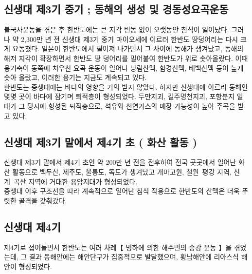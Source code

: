 \documentclass[12pt,a4paper]{book}
\begin{document}
		\subsection{신생대 제3기 중기 ; 동해의 생성 및  경동성요곡운동 }

				불국사운동을 겪은 후 한반도에는 큰 지각 변동 없이 오랫동안 침식이 일어났다. 
				그러나 약 2,300만 년 전 신생대 제3기 중기 마이오세에 이르러 
				한반도 땅덩어리는 다시 크게 요동쳤다. 
				일본이 한반도에서 떨어져 나가면서 그 사이에 동해가 생겨났고, 
				동해의 해저 지각이 확장하면서 한반도 땅 덩어리를 밀어붙여 한반도가 위로 솟아올랐다. 
				이때 융기축이 동쪽에 치우친 요곡 운동이 일어나 낭림산맥, 함경산맥, 태백산맥 등이 
				높게 솟아 올랐고, 이러한 융기는 지금도 계속되고 있다.\\

				한반도는 중생대에는 바다의 영향을 거의 받지 않았다. 
				하지만 신생대에 이르러 동해안 몇몇 곳이 바다에 잠기며 퇴적층이 형성되었다. 
				두만지괴, 길주명천지괴, 포항분지 일대가 
				그 당시에 형성된 퇴적층으로, 석유와 천연가스의 매장 가능성이 높아 주목을 받고 있다. \\



		\subsection{신생대 제3기 말에서 제4기 초 ( 화산 활동 )}

				신생대 제3기 말에서 제4기 초인 약 200만 년 전을 전후하여 
				전국 곳곳에서 일어난 화산 활동으로 백두산, 제주도, 울릉도, 독도가 생겨났고 
				개마고원, 철원~평강 지역, 신계~곡산 지역에 거대한 용암지대가 형성되었다.\\
				
				중생대 이후 구조선을 따라 계속적으로 일어난 침식 작용으로 
				한반도의 산맥은 더욱 뚜렷한 골격을 갖춰갔다. 
				

		\subsection{신생대 제4기}

				제4기로 접어들면서 한반도는 여러 차례【  빙하에 의한 해수면의 승강 운동 】을 겪었는데, 
				그 결과 동해안에는 해안단구가 집중적으로 발달했으며, 
				황남해안에 리아스식 해안이 형성되었다.\\


		\newpage
			
\end{document}
